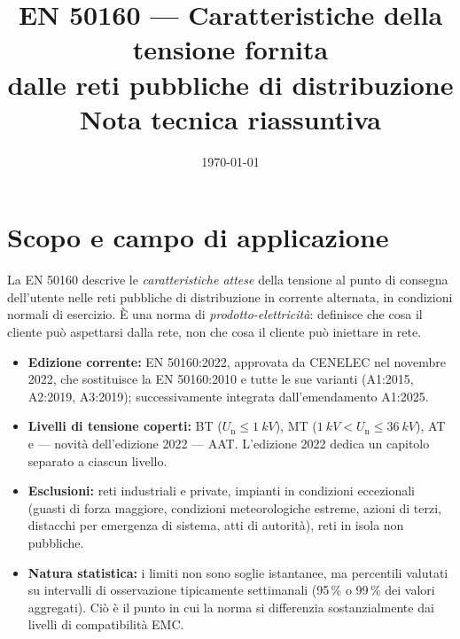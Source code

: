 \documentclass[11pt,a4paper]{article}
\title{\textbf{EN 50160 --- Caratteristiche della tensione fornita\\dalle reti pubbliche di distribuzione}\\[2mm]
\large Nota tecnica riassuntiva}
\author{}
\date{\today}
\newcommand{\Un}{U_{\mathrm{n}}}
\begin{document}
\maketitle
\thispagestyle{fancy}

\begin{center}
\end{center}

\vspace{4mm}

\section{Scopo e campo di applicazione}

La EN 50160 descrive le \emph{caratteristiche attese} della tensione al punto di
consegna dell'utente nelle reti pubbliche di distribuzione in corrente alternata,
in condizioni normali di esercizio. È una norma di \emph{prodotto-elettricità}:
definisce che cosa il cliente può aspettarsi dalla rete, non che cosa il cliente
può iniettare in rete.

\begin{itemize}[itemsep=2pt]
  \item \textbf{Edizione corrente:} EN 50160:2022, approvata da CENELEC nel novembre 2022,
        che sostituisce la EN 50160:2010 e tutte le sue varianti
        (A1:2015, A2:2019, A3:2019); successivamente integrata dall'emendamento A1:2025.
  \item \textbf{Livelli di tensione coperti:} BT ($\Un \le \SI{1}{kV}$),
        MT ($\SI{1}{kV} < \Un \le \SI{36}{kV}$), AT e --- novità dell'edizione 2022 ---
        AAT. L'edizione 2022 dedica un capitolo separato a ciascun livello.
  \item \textbf{Esclusioni:} reti industriali e private, impianti in condizioni eccezionali
        (guasti di forza maggiore, condizioni meteorologiche estreme, azioni di terzi,
        distacchi per emergenza di sistema, atti di autorità), reti in isola non pubbliche.
  \item \textbf{Natura statistica:} i limiti non sono soglie istantanee, ma percentili
        valutati su intervalli di osservazione tipicamente settimanali
        (95\,\% o 99\,\% dei valori aggregati). Ciò è il punto in cui la norma si
        differenzia sostanzialmente dai livelli di compatibilità EMC.
\end{itemize}
\end{document}
